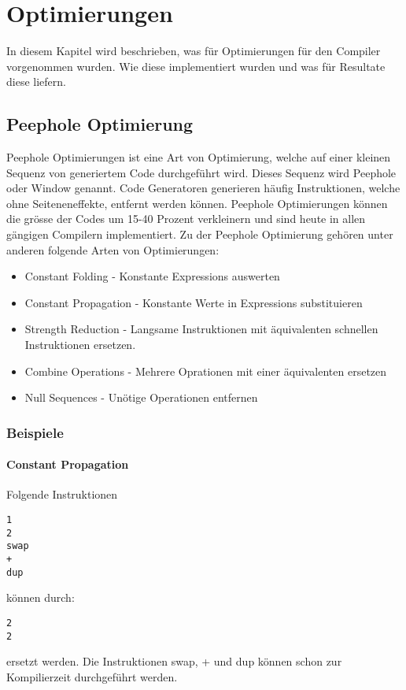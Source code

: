 \chapter{Optimierungen}

In diesem Kapitel wird beschrieben, was für Optimierungen für den Compiler vorgenommen wurden. Wie diese implementiert wurden und was für Resultate diese liefern.

\section{Peephole Optimierung}

Peephole Optimierungen ist eine Art von Optimierung, welche auf einer kleinen Sequenz von generiertem Code durchgeführt wird. Dieses Sequenz wird Peephole oder Window genannt. Code Generatoren generieren häufig Instruktionen, welche ohne Seiteneneffekte, entfernt werden können. Peephole Optimierungen können die grösse der Codes um 15-40 Prozent verkleinern und sind heute in allen gängigen Compilern implementiert.\cite{peepdavidson} Zu der Peephole Optimierung gehören unter anderen folgende Arten von Optimierungen:

\begin{itemize} 
	\item Constant Folding - Konstante Expressions auswerten
	\item Constant Propagation - Konstante Werte in Expressions substituieren
	\item Strength Reduction - Langsame Instruktionen mit äquivalenten schnellen Instruktionen ersetzen.
	\item Combine Operations - Mehrere Oprationen mit einer äquivalenten ersetzen
	\item Null Sequences - Unötige Operationen entfernen\cite{peepwiki}
\end{itemize}


\subsection{Beispiele}
\subsubsection{Constant Propagation}
\label{constantprogationsection}

Folgende Instruktionen
%
\begin{verbatim}
1
2
swap
+
dup
\end{verbatim}
%
können durch:
%
\begin{verbatim}
2
2
\end{verbatim}
%
ersetzt werden. Die Instruktionen swap, + und dup können schon zur Kompilierzeit durchgeführt werden.
